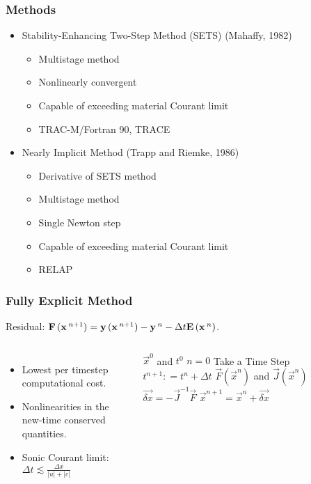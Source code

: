 \documentclass[compress,xcolor=table]{beamer}
\begin{document}
\begin{frame} 
\frametitle{Methods}
\begin{itemize}
\item{Stability-Enhancing Two-Step Method (SETS) (Mahaffy, 1982)
\begin{itemize}
\item{Multistage method}
\item{Nonlinearly convergent}
\item{Capable of exceeding material Courant limit}
\item{TRAC-M/Fortran 90, TRACE}
\end{itemize}
}
\item{Nearly Implicit Method (Trapp and Riemke, 1986)
\begin{itemize}
\item{Derivative of SETS method}
\item{Multistage method}
\item{Single Newton step}
\item{Capable of exceeding material Courant limit}
\item{RELAP}
\end{itemize}
}
\end{itemize}

\end{frame}
\begin{frame} 
\frametitle{Fully Explicit Method}
Residual: $\vec{F}(\vec{x}^{n+1}) = \vec{y}(\vec{x}^{n+1}) - \vec{y}^{n} - \dt{} \vec{E}(\vec{x}^{n})$.
\begin{columns}
\begin{itemize}
\item{Lowest per timestep computational cost.}
\item{Nonlinearities in the new-time conserved quantities.}
\item{Sonic Courant limit: $ \Delta t \lesssim \frac{\Delta x}{|u|+|c|}$}
\end{itemize}

\begin{algorithmic}
\scriptsize
\Require $\vec{x}^{0}$ and $t^{0}$
\Set $n = 0$
\Loop \; Take a Time Step
    \Set $t^{n+1} : = t^{n} + \Delta t$
    \Calculate $\vec{F}(\vec{x}^n)$ and $\vec{J}(\vec{x}^n)$
    \Calculate $\vec{\delta x} = -\vec{J}^{-1}\vec{F}$
    \Calculate $\vec{x}^{n+1} = \vec{x}^{n} + \vec{\delta x}$ 
\end{algorithmic}

\end{columns}

\end{frame}
\end{document}

